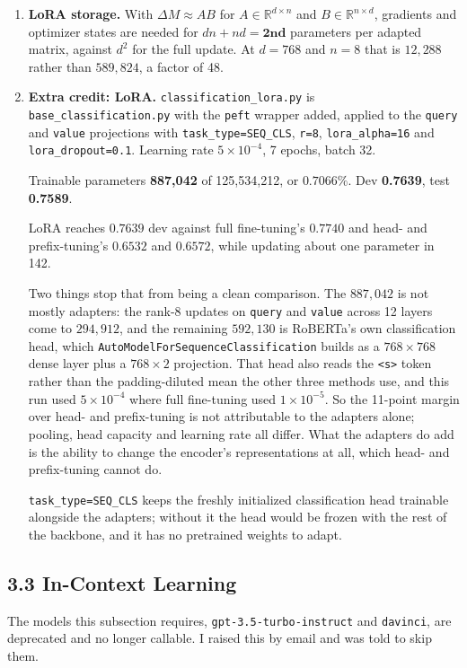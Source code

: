 \documentclass[11pt]{article}
\begin{document}
\begin{enumerate}
        The saving does not extend to activation memory, which scales with where the tuned parameter
        sits and how long the sequence is, and for prefix-tuning it reverses.

  \item \textbf{LoRA storage.} With $\Delta M \approx AB$ for $A \in \mathbb{R}^{d \times n}$ and
        $B \in \mathbb{R}^{n \times d}$, gradients and optimizer states are needed for
        $dn + nd = \mathbf{2nd}$ parameters per adapted matrix, against $d^2$ for the full
        update. At $d = 768$ and $n = 8$ that is $12{,}288$ rather than $589{,}824$, a factor of
        48.

  \item \textbf{Extra credit: LoRA.} \texttt{classification\_lora.py} is
        \texttt{base\_classification.py} with the \texttt{peft} wrapper added, applied to the
        \texttt{query} and \texttt{value} projections with \texttt{task\_type=SEQ\_CLS},
        \texttt{r=8}, \texttt{lora\_alpha=16} and \texttt{lora\_dropout=0.1}. Learning rate
        $5 \times 10^{-4}$, 7 epochs, batch 32.

        Trainable parameters \textbf{887{,}042} of 125{,}534{,}212, or $0.7066\%$.
        Dev \textbf{0.7639}, test \textbf{0.7589}.

        LoRA reaches $0.7639$ dev against full fine-tuning's $0.7740$ and head- and prefix-tuning's
        $0.6532$ and $0.6572$, while updating about one parameter in 142. {\sloppy Two things stop that from
        being a clean comparison. The $887{,}042$ is not mostly adapters: the rank-8 updates on
        \texttt{query} and \texttt{value} across 12 layers come to $294{,}912$, and the remaining
        $592{,}130$ is RoBERTa's own classification head, which
        \texttt{AutoModelForSequenceClassification} builds as a $768 \times 768$ dense layer plus a
        $768 \times 2$ projection. That head also reads the \texttt{<s>} token rather than the
        padding-diluted mean the other three methods use, and this run used
        $5 \times 10^{-4}$ where full fine-tuning used $1 \times 10^{-5}$. So the 11-point margin
        over head- and prefix-tuning is not attributable to the adapters alone; pooling, head
        capacity and learning rate all differ. What the adapters do add is the ability to change the
        encoder's representations at all, which head- and prefix-tuning cannot do.\par}

        \texttt{task\_type=SEQ\_CLS} keeps the freshly initialized classification head trainable alongside the adapters; without it the head
        would be frozen with the rest of the backbone, and it has no pretrained weights to adapt.
\end{enumerate}

\subsection*{3.3 In-Context Learning}

{\sloppy
The models this subsection requires, \texttt{gpt-3.5-turbo-instruct} and \texttt{davinci}, are deprecated and no longer callable.
I raised this by email and was told to skip them.
\par}
\end{document}
